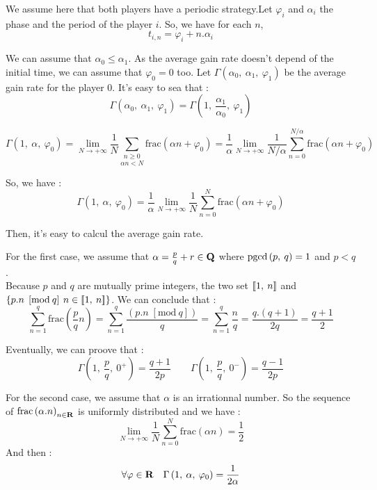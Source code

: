 We assume here that both players have a periodic strategy.Let $ \varphi_i $ and 
$ \alpha_i $ the phase and the period of the player $i$. So, we have for each $n$,
\[ t_{i,n} = \varphi_i + n.\alpha_i \]

We can assume that $\alpha_0 \leq \alpha_1 $. 
As the average gain rate doesn't depend of the initial time, we can assume that $ \varphi_0 = 0 $ too.
Let $ \Gamma\left(\alpha_0,\:\alpha_1,\:\varphi_1\right) $ be the average gain rate for the player $ 0 $.
It's easy to sea that :
\[ \Gamma\left(\alpha_0,\:\alpha_1,\:\varphi_1\right) = \Gamma\left(1,\:\frac{\alpha_1}{\alpha_0},\:\varphi_1\right) \]


\[
\Gamma\left(1,\:\alpha,\:\varphi_{0}\right)=\lim_{N\rightarrow+\infty}\frac{1}{N}
\underset{\alpha n<N}{\underset{n\geq0}{\sum}}\mathrm{frac}\left(\alpha n+\varphi_{0}\right)
=\frac{1}{\alpha}\lim_{N\rightarrow+\infty}\frac{1}{N/\alpha}
\underset{n=0}{\overset{N/\alpha}{\sum}}\mathrm{frac}\left(\alpha n+\varphi_{0}\right)\]

So, we have :\[
\Gamma\left(1,\:\alpha,\:\varphi_{0}\right)=\frac{1}{\alpha}\lim_{N\rightarrow+\infty}\frac{1}{N}
\underset{n=0}{\overset{N}{\sum}}\mathrm{frac}\left(\alpha n+\varphi_{0}\right)\]

Then, it's easy to calcul the average gain rate.

For the first case, we assume that $\alpha=\frac{p}{q}+r\in\textbf{Q}$ where $\mathrm{pgcd}\left(p,\: q\right)=1$ and $ p<q $.\\
Because $p$ and $q$ are mutually prime integers, the two set $\left[\!\left[1,\:n\right]\!\right]$ and
$\left\{p.n\;\left[\mathrm{mod}\: q\right]\: n\in\left[\!\left[1,\:n\right]\!\right]\right\}$.
We can conclude that :\[
\underset{n=1}{\overset{q}{\sum}}\mathrm{frac}\left(\frac{p}{q}n\right)
=\underset{n=1}{\overset{q}{\sum}}\frac{\left(p.n\;\left[\mathrm{mod}\: q\right]\right)}{q}
=\underset{n=1}{\overset{q}{\sum}}\frac{n}{q}=\frac{q.\left(q+1\right)}{2q}=\frac{q+1}{2}\]

Eventually, we can proove that : \[
\Gamma\left(1,\:\frac{p}{q},\:0^{+}\right)=\frac{q+1}{2p} \qquad
\Gamma\left(1,\:\frac{p}{q},\:0^{-}\right)=\frac{q-1}{2p}
\]

For the second case, we assume that $\alpha$ is an irrationnal number.
So the sequence of $ \mathrm{frac}\left(\alpha.n\right)_{n\in\textbf{R}} $ is uniformly distributed
and we have : \[
\lim_{N\rightarrow+\infty}\frac{1}{N}
\underset{n=0}{\overset{N}{\sum}}\mathrm{frac}\left(\alpha n\right) = \frac{1}{2}
\]
And then : \[
\forall\varphi\in\textbf{R}\quad\Gamma\left(1,\:\alpha,\:\varphi_{0}\right)=\frac{1}{2\alpha}
\]